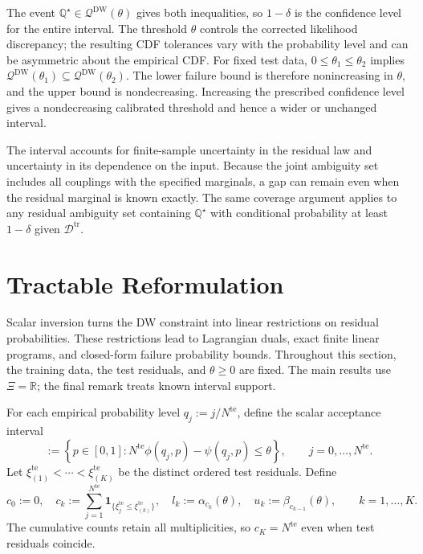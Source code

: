 \documentclass[review,11pt,3p,authoryear,nopreprintline]{elsarticle}
\begin{document}
The event $\mathbb Q^\star\in\mathcal Q^{\mathrm{DW}}(\theta)$ gives both inequalities, so $1-\delta$ is the confidence level for the entire interval. The threshold $\theta$ controls the corrected likelihood discrepancy; the resulting CDF tolerances vary with the probability level and can be asymmetric about the empirical CDF. For fixed test data, $0\le\theta_1\le\theta_2$ implies $\mathcal Q^{\mathrm{DW}}(\theta_1)\subseteq\mathcal Q^{\mathrm{DW}}(\theta_2)$. The lower failure bound is therefore nonincreasing in $\theta$, and the upper bound is nondecreasing. Increasing the prescribed confidence level gives a nondecreasing calibrated threshold and hence a wider or unchanged interval.

The interval accounts for finite-sample uncertainty in the residual law and uncertainty in its dependence on the input. Because the joint ambiguity set includes all couplings with the specified marginals, a gap can remain even when the residual marginal is known exactly. The same coverage argument applies to any residual ambiguity set containing $\mathbb Q^\star$ with conditional probability at least $1-\delta$ given $\mathcal D^{\mathrm{tr}}$.


\section{Tractable Reformulation}
\label{sec-reformulation}

Scalar inversion turns the DW constraint into linear restrictions on residual probabilities. These restrictions lead to Lagrangian duals, exact finite linear programs, and closed-form failure probability bounds. Throughout this section, the training data, the test residuals, and $\theta\ge0$ are fixed. The main results use $\Xi=\mathbb R$; the final remark treats known interval support.

For each empirical probability level $q_j:=j/N^{\mathrm{te}}$, define the scalar acceptance interval
\begin{equation}
  [\alpha_j(\theta),\beta_j(\theta)]
  :=\left\{p\in[0,1]:
  N^{\mathrm{te}}\phi(q_j,p)-\psi(q_j,p)\le\theta\right\},
  \qquad j=0,\ldots,N^{\mathrm{te}}.
  \label{eq-dw-rank-acceptance}
\end{equation}
Let $\xi_{(1)}^{\mathrm{te}}<\cdots<\xi_{(K)}^{\mathrm{te}}$ be the distinct ordered test residuals. Define
\begin{equation} 
    c_0 :=0, \quad
    c_k :=\sum_{j=1}^{N^{\mathrm{te}}}\mathbf1_{\{\xi_j^{\mathrm{te}}\le\xi_{(k)}^{\mathrm{te}}\}}, \quad
    l_k :=\alpha_{c_k}(\theta),  \quad
    u_k :=\beta_{c_{k-1}}(\theta),\qquad k=1,\ldots,K.
  \label{eq-dw-counts-and-levels}
\end{equation}
The cumulative counts retain all multiplicities, so $c_K=N^{\mathrm{te}}$ even when test residuals coincide.
\end{document}
